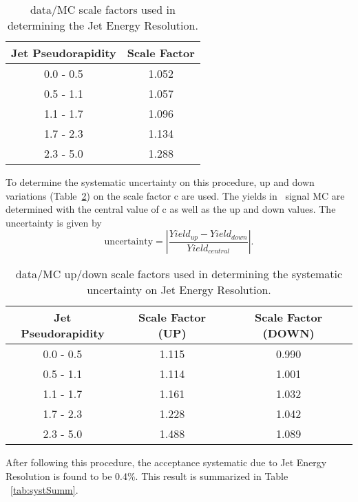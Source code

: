 \begin{table}[h]
\caption{ \label{tab:jer_scalefactor} data/MC scale factors used in determining the Jet Energy Resolution.}
\begin{center}
\begin{tabular}{c|c}\hline
Jet Pseudorapidity & Scale Factor \\ \hline \hline
0.0 - 0.5 & 1.052 \\
0.5 - 1.1 & 1.057 \\
1.1 - 1.7 & 1.096 \\
1.7 - 2.3 & 1.134 \\
2.3 - 5.0 & 1.288 \\
\hline
\hline
\end{tabular}
\end{center}
\end{table}

To determine the systematic uncertainty on this procedure, up and down variations (Table~\ref{tab:jer_scalefactor_updown}) on the scale factor c are used. The yields in \ttZ \ signal MC are determined with the central value of c as well as the up and down values. The uncertainty is given by
\begin{equation}
\mathrm{uncertainty} = | \frac{Yield _{up} - Yield _{down}}{Yield _{central}} |.
\end{equation}

\begin{table}[h]
\caption{ \label{tab:jer_scalefactor_updown} data/MC up/down scale factors used in determining the systematic uncertainty on Jet Energy Resolution.}
\begin{center}
\begin{tabular}{c|c|c}\hline
Jet Pseudorapidity & Scale Factor (UP) & Scale Factor (DOWN)\\ \hline \hline
0.0 - 0.5 & 1.115 & 0.990 \\
0.5 - 1.1 & 1.114 & 1.001 \\
1.1 - 1.7 & 1.161 & 1.032 \\
1.7 - 2.3 & 1.228 & 1.042 \\
2.3 - 5.0 & 1.488 & 1.089 \\
\hline
\hline
\end{tabular}
\end{center}
\end{table}

After following this procedure, the acceptance systematic due to Jet Energy Resolution is found to be 0.4\%. This result is summarized in Table ~\ref{tab:systSumm}.\\

